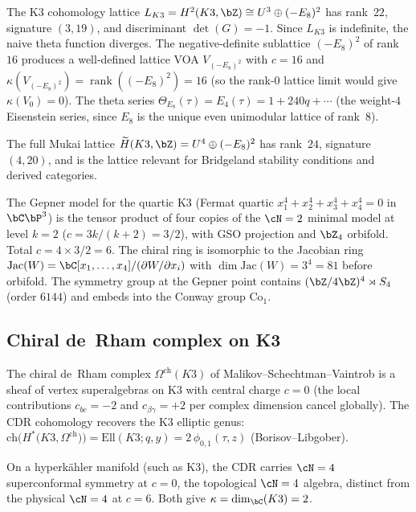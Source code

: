 \begin{remark}
\label{rem:lattice-voa-k3}
The K3 cohomology lattice $L_{K3} = H^2(K3,\bZ) \cong U^3 \oplus
(-E_8)^2$ has rank~$22$, signature $(3,19)$, and discriminant
$\det(G) = -1$. Since $L_{K3}$ is indefinite, the naive theta
function diverges. The negative-definite sublattice $(-E_8)^2$
of rank~$16$ produces a well-defined lattice VOA
$V_{(-E_8)^2}$ with $c = 16$ and
$\kappa(V_{(-E_8)^2}) = \operatorname{rank}((-E_8)^2) = 16$
(so the rank-$0$ lattice limit would give
$\kappa(V_{0}) = 0$). The
theta series $\Theta_{E_8}(\tau) = E_4(\tau) = 1 + 240q + \cdots$
(the weight-$4$ Eisenstein series, since $E_8$ is the unique even
unimodular lattice of rank~$8$).

The full Mukai lattice $\widetilde{H}(K3,\bZ) = U^4 \oplus
(-E_8)^2$ has rank~$24$, signature $(4,20)$, and is the lattice
relevant for Bridgeland stability conditions and derived
categories.
\end{remark}

\begin{remark}
\label{rem:gepner-model-k3}
The Gepner model for the quartic K3 (Fermat quartic
$x_1^4 + x_2^4 + x_3^4 + x_4^4 = 0$ in $\bC\bP^3$) is the
tensor product of four copies of the $\cN = 2$ minimal model at
level $k = 2$ ($c = 3k/(k+2) = 3/2$), with GSO
projection and $\bZ_4$ orbifold. Total $c = 4 \times 3/2 = 6$.
The chiral ring is isomorphic to the Jacobian ring
$\mathrm{Jac}(W) = \bC[x_1,\ldots,x_4]/(\partial W/\partial x_i)$
with $\dim \mathrm{Jac}(W) = 3^4 = 81$ before orbifold. The
symmetry group at the Gepner point contains
$(\bZ/4\bZ)^4 \rtimes S_4$ (order $6144$) and embeds into
the Conway group $\mathrm{Co}_1$.
\end{remark}

\subsection{Chiral de~Rham complex on K3}
\label{subsec:cdr-k3}

\begin{remark}[CDR on K3]
\label{rem:cdr-k3}
The chiral de~Rham complex $\Omega^{\mathrm{ch}}(K3)$ of
Malikov--Schechtman--Vaintrob is a sheaf of vertex
superalgebras on K3 with central charge $c = 0$ (the local
contributions $c_{bc} = -2$ and $c_{\beta\gamma} = +2$ per
complex dimension cancel globally). The CDR cohomology
recovers the K3 elliptic genus:
$\mathrm{ch}\bigl(H^*\bigl(K3, \Omega^{\mathrm{ch}}\bigr)\bigr)
= \mathrm{Ell}(K3; q, y) = 2\,\phi_{0,1}(\tau, z)$
(Borisov--Libgober).

On a hyperk\"ahler manifold (such as K3), the CDR carries
$\cN = 4$ superconformal symmetry at $c = 0$, the
topological $\cN = 4$ algebra, distinct from the physical
$\cN = 4$ at $c = 6$. Both give
$\kappa = \dim_\bC(K3) = 2$.
\end{remark}

